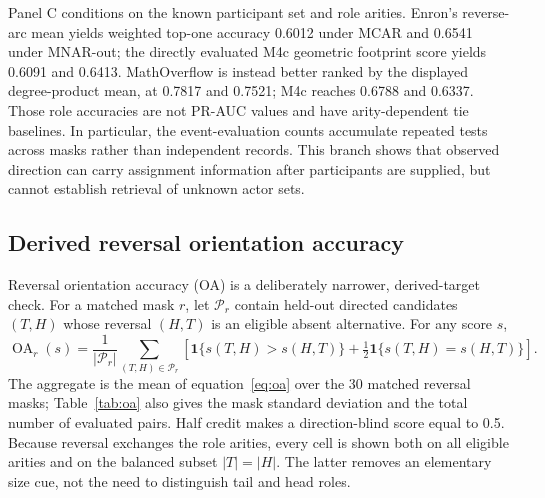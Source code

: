 \documentclass[10pt]{article}
\newcommand{\ind}{\mathbf{1}}
\begin{document}
Panel C conditions on the known participant set and role arities. Enron's reverse-arc mean yields weighted top-one accuracy 0.6012 under MCAR and 0.6541 under MNAR-out; the directly evaluated M4c geometric footprint score yields 0.6091 and 0.6413. MathOverflow is instead better ranked by the displayed degree-product mean, at 0.7817 and 0.7521; M4c reaches 0.6788 and 0.6337. Those role accuracies are not PR-AUC values and have arity-dependent tie baselines. In particular, the event-evaluation counts accumulate repeated tests across masks rather than independent records. This branch shows that observed direction can carry assignment information after participants are supplied, but cannot establish retrieval of unknown actor sets.

\subsection{Derived reversal orientation accuracy}
Reversal orientation accuracy (OA) is a deliberately narrower, derived-target check.  For a matched mask $r$, let $\mathcal P_r$ contain held-out directed candidates $(T,H)$ whose reversal $(H,T)$ is an eligible absent alternative.  For any score $s$,
\begin{equation}
 \operatorname{OA}_r(s)=\frac{1}{|\mathcal P_r|}\sum_{(T,H)\in\mathcal P_r}
 \left[\ind\{s(T,H)>s(H,T)\}+\tfrac12\ind\{s(T,H)=s(H,T)\}\right].
 \label{eq:oa}
\end{equation}
The aggregate is the mean of equation~\eqref{eq:oa} over the 30 matched reversal masks; Table~\ref{tab:oa} also gives the mask standard deviation and the total number of evaluated pairs.  Half credit makes a direction-blind score equal to 0.5.  Because reversal exchanges the role arities, every cell is shown both on all eligible arities and on the balanced subset $|T|=|H|$.  The latter removes an elementary size cue, not the need to distinguish tail and head roles.
\end{document}
